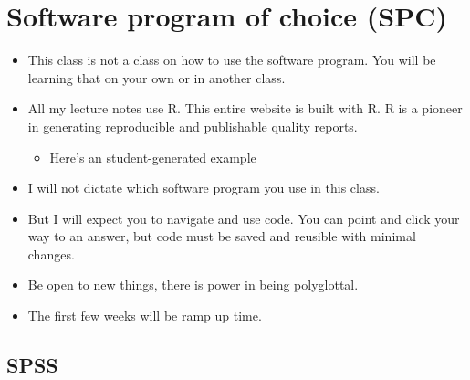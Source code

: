 \documentclass[]{article}
\providecommand{\tightlist}{%
  \setlength{\itemsep}{0pt}\setlength{\parskip}{0pt}}
\begin{document}
\section{Software program of choice
(SPC)}\label{software-program-of-choice-spc}

\begin{itemize}
\tightlist
\item
  This class is not a class on how to use the software program. You will
  be learning that on your own or in another class.
\item
  All my lecture notes use R. This entire website is built with R. R is
  a pioneer in generating reproducible and publishable quality reports.

  \begin{itemize}
  \tightlist
  \item
    \href{../reading/Final_chem_report.pdf}{Here's an student-generated
    example}
  \end{itemize}
\item
  I will not dictate which software program you use in this class.
\item
  But I will expect you to navigate and use code. You can point and
  click your way to an answer, but code must be saved and reusible with
  minimal changes.
\item
  Be open to new things, there is power in being polyglottal.
\item
  The first few weeks will be ramp up time.
\end{itemize}

\subsection{SPSS}\label{spss}
\end{document}
